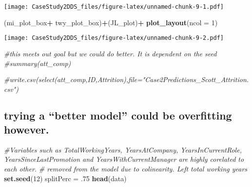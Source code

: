 \documentclass[
]{article}
\newenvironment{Shaded}{\begin{snugshade}}{\end{snugshade}}
\newcommand{\CommentTok}[1]{\textcolor[rgb]{0.56,0.35,0.01}{\textit{#1}}}
\newcommand{\DataTypeTok}[1]{\textcolor[rgb]{0.13,0.29,0.53}{#1}}
\newcommand{\DecValTok}[1]{\textcolor[rgb]{0.00,0.00,0.81}{#1}}
\newcommand{\FloatTok}[1]{\textcolor[rgb]{0.00,0.00,0.81}{#1}}
\newcommand{\KeywordTok}[1]{\textcolor[rgb]{0.13,0.29,0.53}{\textbf{#1}}}
\newcommand{\NormalTok}[1]{#1}
\newcommand{\OperatorTok}[1]{\textcolor[rgb]{0.81,0.36,0.00}{\textbf{#1}}}
\newcommand{\StringTok}[1]{\textcolor[rgb]{0.31,0.60,0.02}{#1}}
\begin{document}
\texttt{[image: CaseStudy2DDS\_files/figure-latex/unnamed-chunk-9-1.pdf]}

\begin{Shaded}
\begin{Highlighting}[]
\NormalTok{(mi_plot_box}\OperatorTok{+}\StringTok{ }\NormalTok{twy_plot_box)}\OperatorTok{+}\NormalTok{(JL_plot)}\OperatorTok{+}\StringTok{ }\KeywordTok{plot_layout}\NormalTok{(}\DataTypeTok{ncol =} \DecValTok{1}\NormalTok{)}
\end{Highlighting}
\end{Shaded}

\texttt{[image: CaseStudy2DDS\_files/figure-latex/unnamed-chunk-9-2.pdf]}

\begin{Shaded}
\begin{Highlighting}[]
\CommentTok{#this meets out goal but we could do better. It is dependent on the seed}
\CommentTok{#summary(att_comp)}


\CommentTok{#write.csv(select(att_comp,ID,Attrition),file="Case2Predictions_Scott_Attrition.csv")}
\end{Highlighting}
\end{Shaded}

\hypertarget{trying-a-better-model-could-be-overfitting-however.}{%
\subsection{trying a ``better model'' could be overfitting
however.}\label{trying-a-better-model-could-be-overfitting-however.}}

\begin{Shaded}
\begin{Highlighting}[]
\CommentTok{#Variables such as TotalWorkingYears, YearsAtCompany, YearsInCurrentRole, YearsSinceLastPromotion and YearsWithCurrentManager are highly corelated to each other.}
\CommentTok{# removed from the model due to colinearity. Left total working years}
\KeywordTok{set.seed}\NormalTok{(}\DecValTok{12}\NormalTok{)}
\NormalTok{splitPerc =}\StringTok{ }\FloatTok{.75}
\KeywordTok{head}\NormalTok{(data)}
\end{Highlighting}
\end{Shaded}
\end{document}
